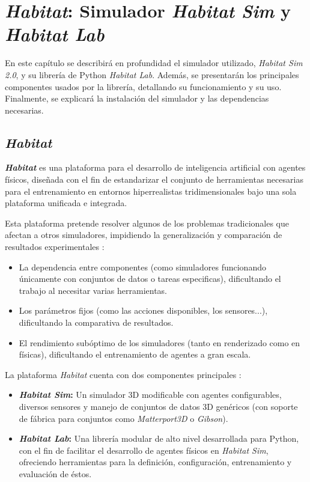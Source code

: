 \chapter{\textit{Habitat}: Simulador \textit{Habitat Sim} y \textit{Habitat Lab}}

En este capítulo se describirá en profundidad el simulador utilizado, \textit{Habitat Sim 2.0}, y su librería de Python \textit{Habitat Lab}. Además, se presentarán los principales componentes usados por la librería, detallando su funcionamiento y su uso. Finalmente, se explicará la instalación del simulador y las dependencias necesarias.

\section{\textit{Habitat}}

\textbf{\textit{Habitat}} \cite{habitat19iccv} es una plataforma para el desarrollo de inteligencia artificial con agentes físicos, diseñada con el fin de estandarizar el conjunto de herramientas necesarias para el entrenamiento en entornos hiperrealistas tridimensionales bajo una sola plataforma unificada e integrada.

Esta plataforma pretende resolver algunos de los problemas tradicionales que afectan a otros simuladores, impidiendo la generalización y comparación de resultados experimentales \cite{habitat19iccv}:
\begin{itemize}
	\item La dependencia entre componentes (como simuladores funcionando únicamente con conjuntos de datos o tareas especificas), dificultando el trabajo al necesitar varias herramientas.
	\item Los parámetros fijos (como las acciones disponibles, los sensores...), dificultando la comparativa de resultados.
	\item El rendimiento subóptimo de los simuladores (tanto en renderizado como en físicas), dificultando el entrenamiento de agentes a gran escala. 
\end{itemize}

La plataforma \textit{Habitat} cuenta con dos componentes principales \cite{habitat19iccv}:
\begin{itemize}
	\item \textbf{\textit{Habitat Sim}:} Un simulador 3D modificable con agentes configurables, diversos sensores y manejo de conjuntos de datos 3D genéricos (con soporte de fábrica para conjuntos como \textit{Matterport3D} o \textit{Gibson}).
	\item \textbf{\textit{Habitat Lab}:} Una librería modular de alto nivel desarrollada para Python, con el fin de facilitar el desarrollo de agentes físicos en \textit{Habitat Sim}, ofreciendo herramientas para la definición, configuración, entrenamiento y evaluación de éstos.
\end{itemize}

